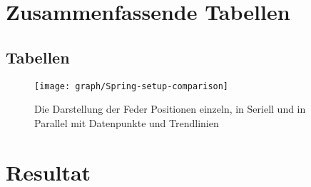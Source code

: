 \documentclass[../main.tex]{subfiles} %
\begin{document}
\section{Zusammenfassende Tabellen}\label{sec:zusammenfassende-tabellen}
    \subsection{Tabellen}\label{subsec:tabellen}
    \begin{figure}[H]
        \centering
        \texttt{[image: graph/Spring-setup-comparison]}
        \caption{Die Darstellung der Feder Positionen einzeln, in Seriell und in Parallel mit Datenpunkte und Trendlinien}\label{fig:figure}
    \end{figure}
    \section{Resultat}\label{subsec:resultat}
\end{document}
